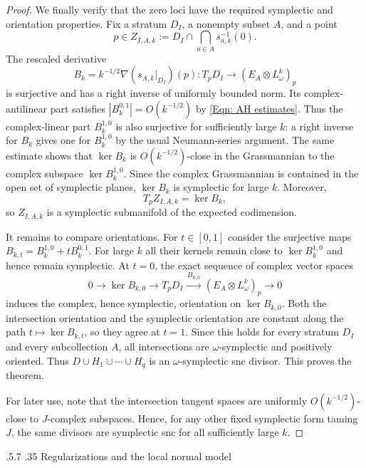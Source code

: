 \documentclass[11pt]{amsart}
\makeatletter
\numberwithin{equation}{section}
\renewcommand{\section}{%
  \@startsection{section}{1}%
    \z@
    {.5\linespacing\@plus.7\linespacing}%
    {.35\linespacing}%
    {\normalfont\bfseries}}
\theoremstyle{plain}
\theoremstyle{definition}
\makeatother
\begin{document}
\begin{proof}
We finally verify that the zero loci have the required symplectic and
orientation properties. Fix a stratum $D_I$, a nonempty subset $A$, and a
point
\[
p\in Z_{I,A,k}:=D_I\cap\bigcap_{a\in A}s_{a,k}^{-1}(0).
\]
The rescaled derivative
\[
B_k=k^{-1/2}\nabla(s_{A,k}|_{D_I})(p):
T_pD_I\longrightarrow(E_A\otimes L_\omega^k)_p
\]
is surjective and has a right inverse of uniformly bounded norm. Its
complex-antilinear part satisfies $|B_k^{0,1}|=O(k^{-1/2})$ by
\eqref{Eqn: AH estimates}. Thus the complex-linear part $B_k^{1,0}$ is also
surjective for sufficiently large $k$: a right inverse for $B_k$ gives one
for $B_k^{1,0}$ by the usual Neumann-series argument. The same estimate shows
that $\ker B_k$ is $O(k^{-1/2})$-close in the Grassmannian to the complex
subspace $\ker B_k^{1,0}$. Since the complex Grassmannian is contained in the
open set of symplectic planes, $\ker B_k$ is symplectic for large $k$.
Moreover,
\[
T_pZ_{I,A,k}=\ker B_k,
\]
so $Z_{I,A,k}$ is a symplectic submanifold of the expected codimension.

It remains to compare orientations. For $t\in[0,1]$ consider the
surjective maps $B_{k,t}=B_k^{1,0}+tB_k^{0,1}$. For large $k$ all their
kernels remain close to $\ker B_k^{1,0}$ and hence remain symplectic. At $t=0$, 
the exact sequence of complex vector spaces
\[
0\longrightarrow\ker B_{k,0}\longrightarrow T_pD_I
\xrightarrow{\,B_{k,0}\,}
(E_A\otimes L_\omega^k)_p\longrightarrow0
\]
induces the complex, hence symplectic, orientation on $\ker B_{k,0}$. Both the
intersection orientation and the symplectic orientation are constant along the
path $t\mapsto\ker B_{k,t}$, so they agree at $t=1$. Since this holds for every
stratum $D_I$ and every subcollection $A$, all intersections are
$\omega$-symplectic and positively oriented. Thus $D\cup H_1\cup\cdots\cup H_q$
is an $\omega$-symplectic snc divisor. This proves the theorem.

For later use, note that the intersection tangent spaces are uniformly
$O(k^{-1/2})$-close to $J$-complex subspaces. Hence, for any other fixed
symplectic form taming $J$, the same divisors are symplectic snc for all
sufficiently large $k$.
\end{proof}



\section{Regularizations and the local normal model}
\label{SS: Regularizations and local model}
\end{document}
